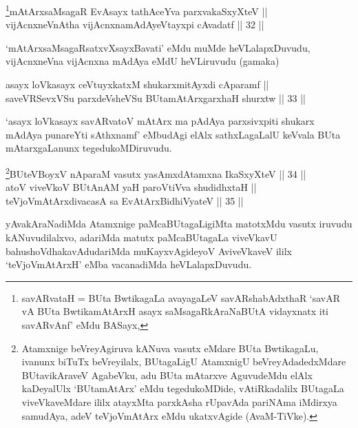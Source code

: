 \begin{shl}
\footnote{savARvataH = BUta BwtikagaLa avayagaLeV savARshabAdxthaR
`savAR vA BUta BwtikamAtArxH asayx saMsagaRkAraNaBUtA vidayxnatx iti savARvAnf' eMdu BASayx,}mAtArxsaMsagaR EvAsayx tathAceYva parxvakaSxyXteV || \\
vijAcnxneVnAtha vijAcnxnamAdAyeVtayxpi cAvadatf \hfill || 32 || 
\end{shl}

\begin{artha}
`mAtArx\s saMsagaRsatxvXsayxBavati' eMdu muMde
heVLalapxDuvudu, vijAcnxneVna vijAcnxna mAdAya eMdU heVLiruvudu
(gamaka)
\end{artha}

\begin{shl}
asayx loVkasayx ceVtuyxkatxM shukarxmitAyxdi cAparamf || \\
saveVRSevxVSu parxdeVsheVSu BUtamAtArxgarxhaH shurxtw \hfill || 33 ||  
\end{shl}

\begin{artha}
`asayx loVkasayx savARvatoV mAtArx ma pAdAya parxsivxpiti shukarx mAdAya punareYti sAthxnamf' eMbudAgi elAlx sathxLagaLalU keVvala BUta mAtarxgaLanunx
tegedukoMDiruvudu.
\end{artha}

\begin{shl}
\footnote{Atamxnige beVreyAgiruva kANuva vasutx eMdare BUta
BwtikagaLu, ivanunx biTuTx beVreyilalx, BUtagaLigU AtamxnigU
beVreyAdadedxMdare BUtavikAraveV AgabeVku, adu BUta mAtarxve
AguvudeMdu elAlx kaDeyalUlx `BUtamAtArx' eMdu tegedukoMDide,
vAtiRkadalilx BUtagaLa viveVkaveMdare ililx atayxMta parxkAsha
rUpavAda pariNAma iMdirxya samudAya, adeV teVjoVmAtArx eMdu
ukatxvAgide (AvaM-TiVke).}BUteVBoyxV nAparaM vasutx yasAmxdAtamxna IkaSxyXteV \hfill || 34 || \\
atoV viveVkoV BUtAnAM yaH paroV\s tiVva shudidhxtaH || \\
teVjoVmAtArxdivacasA sa EvAtArxBidhiVyateV \hfill || 35 ||  
\end{shl}

\begin{artha}
yAvakAraNadiMda Atamxnige paMcaBUtagaLigiMta matotxMdu vasutx iruvudu
kANuvudilalxvo, adariMda matutx paMcaBUtagaLa viveVkavU
bahushoVdhakavAdudariMda muKayxvAgideyoV AviveVkaveV ililx
`teVjoVmAtArxH' eMba vacanadiMda heVLalapxDuvudu.
\end{artha}


